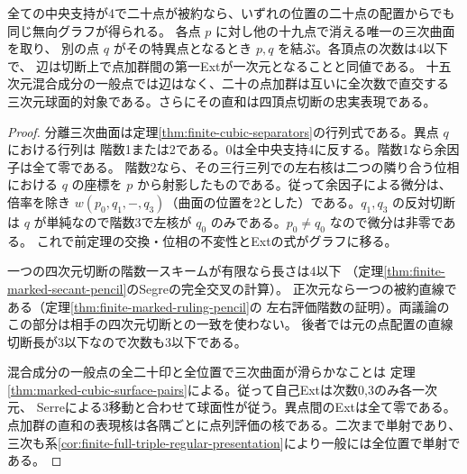\begin{corollary}\label{cor:finite-separator-singularity-graph}
全ての中央支持が4で二十点が被約なら、いずれの位置の二十点の配置からでも同じ無向グラフが得られる。
各点 $p$ に対し他の十九点で消える唯一の三次曲面を取り、
別の点 $q$ がその特異点となるとき $p,q$ を結ぶ。各頂点の次数は4以下で、
辺は切断上で点加群間の第一Extが一次元となることと同値である。
十五次元混合成分の一般点では辺はなく、二十の点加群は互いに全次数で直交する
三次元球面的対象である。さらにその直和は四頂点切断の忠実表現である。
\end{corollary}
\begin{proof}
分離三次曲面は定理\ref{thm:finite-cubic-separators}の行列式である。異点 $q$ における行列は
階数1または2である。0は全中央支持4に反する。階数1なら余因子は全て零である。
階数2なら、その三行三列での左右核は二つの隣り合う位相における
$q$ の座標を $p$ から射影したものである。従って余因子による微分は、倍率を除き
$w(p_0,q_1,-,q_3)$（曲面の位置を2とした）である。$q_1,q_3$ の反対切断は
$q$ が単純なので階数3で左核が $q_0$ のみである。$p_0\ne q_0$ なので微分は非零である。
これで前定理の交換・位相の不変性とExtの式がグラフに移る。

一つの四次元切断の階数一スキームが有限なら長さは4以下
（定理\ref{thm:finite-marked-secant-pencil}のSegreの完全交叉の計算）。
正次元なら一つの被約直線である（定理\ref{thm:finite-marked-ruling-pencil}の
左右評価階数の証明）。両議論のこの部分は相手の四次元切断との一致を使わない。
後者では元の点配置の直線切断長が3以下なので次数も3以下である。

混合成分の一般点の全二十印と全位置で三次曲面が滑らかなことは
定理\ref{thm:marked-cubic-surface-pairs}による。従って自己Extは次数0,3のみ各一次元、
Serreによる3移動と合わせて球面性が従う。異点間のExtは全て零である。
点加群の直和の表現核は各隅ごとに点列評価の核である。二次まで単射であり、
三次も系\ref{cor:finite-full-triple-regular-presentation}により一般には全位置で単射である。
\end{proof}
